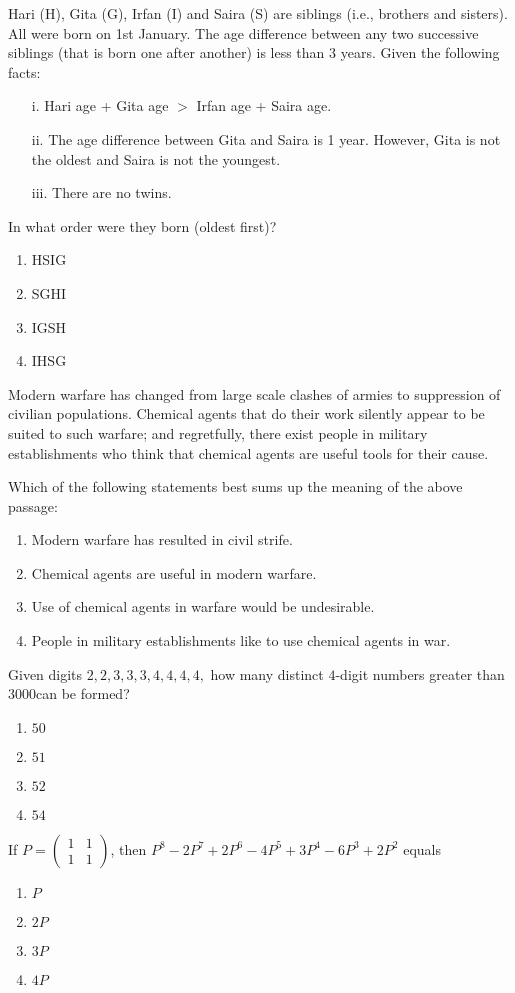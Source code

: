 \item Hari (H), Gita (G), Irfan (I) and Saira (S) are siblings (i.e., brothers and sisters). All were born on 1st January. The age difference between any two successive siblings (that is born one after another) is less than 3 years. Given the following facts:
\begin{enumerate}
    \item[i.] Hari age + Gita age $> $ Irfan  age + Saira age.
    \item[ii.] The age difference between Gita and Saira is 1 year. However, Gita is not the oldest and Saira is not the youngest.
    \item[iii.] There are no twins.
\end{enumerate}
In what order were they born (oldest first)?
\begin{enumerate}
    \item HSIG
    \item SGHI
    \item IGSH
    \item IHSG
\end{enumerate}

\item Modern warfare has changed from large scale clashes of armies to suppression of civilian populations. Chemical agents that do their work silently appear to be suited to such warfare; and regretfully, there exist people in military establishments who think that chemical agents are useful tools for their cause.

Which of the following statements best sums up the meaning of the above passage:
\begin{enumerate}
    \item Modern warfare has resulted in civil strife.
    \item Chemical agents are useful in modern warfare.
    \item Use of chemical agents in warfare would be undesirable.
    \item People in military establishments like to use chemical agents in war.
\end{enumerate}

\item Given digits $2, 2, 3, 3, 3, 4, 4, 4, 4,$ how many distinct $4$-digit numbers greater than$ 3000 $can be formed?
\begin{enumerate}
    \item $50$
    \item $51$
    \item $52$
    \item $54$
\end{enumerate}
\item If $P = \begin{pmatrix} 1 & 1 \\ 1 & 1 \end{pmatrix}$, then $P^8 - 2P^7 + 2P^6 - 4P^5 + 3P^4 - 6P^3 + 2P^2$ equals
\begin{enumerate}
    \item $P$
    \item $2P$
    \item $3P$
    \item $4P$
\end{enumerate}

